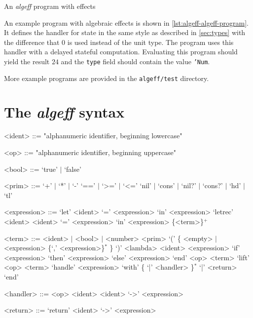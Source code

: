 \documentclass[inz, english, longabstract]{iithesis}
\begin{document}
\begin{listing}[t]
  \caption{An \emph{algeff} program with effects}
  \label{lst:algeff-algeff-program}
\end{listing}

An example program with algebraic effects is shown in \autoref{lst:algeff-algeff-program}.
It defines the handler for state in the same style as described in \autoref{sec:types} with the difference that $0$ is used instead of the unit type.
The program uses this handler with a delayed stateful computation.
Evaluating this program should yield the result $24$ and the \texttt{type} field should contain the value \texttt{'Num}.

More example programs are provided in the \texttt{algeff/test} directory.

\section{The \emph{algeff} syntax}
\begin{grammar}
<ident> ::= "alphanumeric identifier, beginning lowercase"

<op> ::= "alphanumeric identifier, beginning uppercase"

<bool> ::= `true' $\mid$ `false'

<prim> ::= `+' $\mid$ `*' $\mid$ `-'
  \alt `==' $\mid$ `>=' $\mid$ `<='
  \alt `nil' $\mid$ `cons' $\mid$ `nil?' $\mid$ `cons?' $\mid$ `hd' $\mid$ `tl'

<expression> ::= `let' <ident> `=' <expression> `in' <expression>
  \alt `letrec' <ident> <ident> `=' <expression> `in' <expression>
  \alt \{<term>\}$^+$

<term> ::= <ident> $\mid$ <bool> $\mid$ <number>
  \alt <prim> `(' \{ <empty> $\mid$ <expression> \{`,' <expression>\}$^*$ \} `)'
  \alt <lambda> <ident> <expression>
  \alt `if' <expression> `then' <expression> `else' <expression> `end'
  \alt <op> <term>
  \alt `lift' <op> <term>
  \alt `handle' <expression> `with' \{ `|' <handler> \}$^*$ `|' <return> `end'

<handler> ::= <op> <ident> <ident> `->' <expression>

<return> ::= `return' <ident> `->' <expression>
  
\end{grammar}


\printbibliography[heading=bibintoc]
\end{document}

